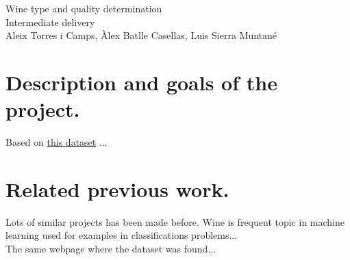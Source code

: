 \documentclass[10pt]{article}
\begin{document}
\begingroup
  \centering
  \Huge Wine type and quality determination \\
  \vskip 0.35cm
  \LARGE Intermediate delivery\\
  \vskip 0.25cm
  \large Aleix Torres i Camps, Àlex Batlle Casellas, Luis Sierra Muntané\\[1.5em]
\endgroup


\section{Description and goals of the project.}
Based on \href{http://archive.ics.uci.edu/ml/datasets/Wine+Quality}{this dataset} ...

\section{Related previous work.}
Lots of similar projects has been made before. Wine is frequent topic in machine learning used for examples in classifications problems...
\\
The same webpage where the dataset was found...
\end{document}

